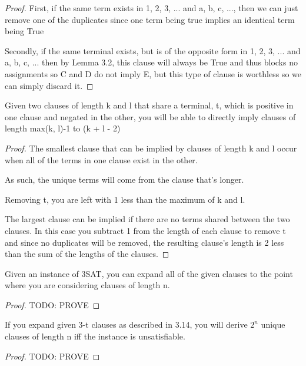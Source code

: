 \documentclass[manuscript]{acmart}
\begin{document}
\begin{proof}
        First, if the same term exists in 1, 2, 3, ... and a, b, c, ..., then we
        can just remove one of the duplicates since one term being true implies an identical term being True

        Secondly, if the same terminal exists, but is of the opposite form in 1, 2, 3, ... and a, b, c, ...
        then by Lemma 3.2, this clause will always be True and thus blocks no assignments so 
        C and D do not imply E, but this type of clause is worthless so we can simply discard it.

    \end{proof}

    \begin{lemma}
        Given two clauses of length k and l that share a terminal, t, which is 
        positive in one clause and negated in the other, you will be able
        to directly imply clauses of length max(k, l)-1 to (k + l - 2)
    \end{lemma}
    \begin{proof}
        The smallest clause that can be implied by clauses of length k and l
        occur when all of the terms in one clause exist in the other.

        As such, the unique terms will come from the clause that's longer.

        Removing t, you are left with 1 less than the maximum of k and l.

        The largest clause can be implied if there are no terms shared between
        the two clauses. In this case you subtract 1 from the length of each
        clause to remove t and since no duplicates will be removed, the 
        resulting clause's length is 2 less than the sum of the lengths of 
        the clauses.
    \end{proof}

    \begin{lemma}
        Given an instance of 3SAT, you can expand all of the given clauses
        to the point where you are considering clauses of length n.
    \end{lemma}
    \begin{proof}
        TODO: PROVE
    \end{proof}

    \begin{lemma}
        If you expand given 3-t clauses as described in 3.14, you will derive
        $2^n$ unique clauses of length n iff the instance is unsatisfiable.
    \end{lemma}
    \begin{proof}
        TODO: PROVE
    \end{proof}
\end{document}
